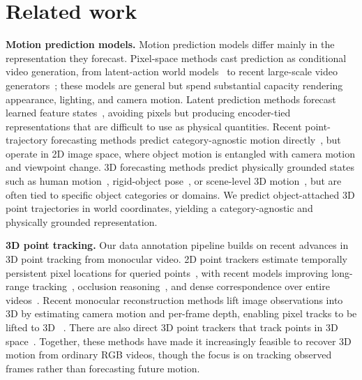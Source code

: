 \section{Related work}
\label{sec:related_work}


\noindent\textbf{Motion prediction models.}
Motion prediction models differ mainly in the representation they forecast. Pixel-space methods cast prediction as conditional video generation, from latent-action world models~\cite{micheli2023iris, hu2023gaia1} to recent large-scale video generators~\cite{bruce2024genie, nvidia2025cosmos, wan22}; these models are general but spend substantial capacity rendering appearance, lighting, and camera motion. Latent prediction methods forecast learned feature states~\cite{zhou2025dinowm, assran2025vjepa2}, avoiding pixels but producing encoder-tied representations that are difficult to use as physical quantities. Recent point-trajectory forecasting methods predict category-agnostic motion directly~\cite{track2act, thakkar2026forecastingmotion}, but operate in 2D image space, where object motion is entangled with camera motion and viewpoint change. 3D forecasting methods predict physically grounded states such as human motion~\cite{mao2020learningtrajectorydependencieshuman}, rigid-object pose~\cite{Yoshida_2025_CVPR, soraki2026objectforesightpredictingfuture3d}, or scene-level 3D motion~\cite{pointworld}, but are often tied to specific object categories or domains. We predict object-attached 3D point trajectories in world coordinates, yielding a category-agnostic and physically grounded representation.


\noindent\textbf{3D point tracking.}
Our data annotation pipeline builds on recent advances in 3D point tracking from monocular video. 2D point trackers estimate temporally persistent pixel locations for queried points~\cite{doersch2022tapvid, doersch2023tapir}, with recent models improving long-range tracking~\cite{doersch2024bootstap}, occlusion reasoning~\cite{cotracker3}, and dense correspondence over entire videos~\cite{alltracker}. 
Recent monocular reconstruction methods lift image observations into 3D by estimating camera motion and per-frame depth, enabling pixel tracks to be lifted to 3D ~\cite{vipe, megasam}. 
There are also direct 3D point trackers that track points in 3D space~\cite{spatialtrackerv2, feng2025st4rtrack, zhang2025efficientlyreconstructingdynamicscenes}. 
Together, these methods have made it increasingly feasible to recover 3D motion from ordinary RGB videos, though the focus is on tracking observed frames rather than forecasting future motion.



